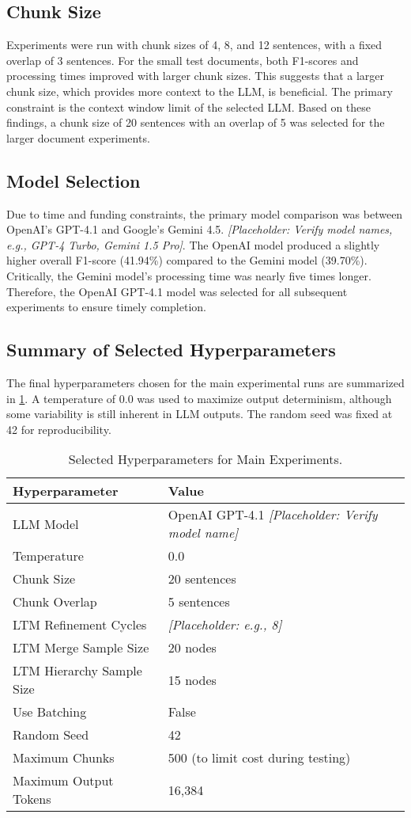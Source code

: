 \subsection{Chunk Size}
Experiments were run with chunk sizes of 4, 8, and 12 sentences, with a fixed overlap of 3 sentences. For the small test documents, both F1-scores and processing times improved with larger chunk sizes. This suggests that a larger chunk size, which provides more context to the LLM, is beneficial. The primary constraint is the context window limit of the selected LLM. Based on these findings, a chunk size of 20 sentences with an overlap of 5 was selected for the larger document experiments.

\subsection{Model Selection}
Due to time and funding constraints, the primary model comparison was between OpenAI's GPT-4.1 and Google's Gemini 4.5. \textit{[Placeholder: Verify model names, e.g., GPT-4 Turbo, Gemini 1.5 Pro]}. The OpenAI model produced a slightly higher overall F1-score (41.94\%) compared to the Gemini model (39.70\%). Critically, the Gemini model's processing time was nearly five times longer. Therefore, the OpenAI GPT-4.1 model was selected for all subsequent experiments to ensure timely completion.

\subsection{Summary of Selected Hyperparameters}
The final hyperparameters chosen for the main experimental runs are summarized in \cref{tab:final_hyperparameters}. A temperature of 0.0 was used to maximize output determinism, although some variability is still inherent in LLM outputs. The random seed was fixed at 42 for reproducibility.

\begin{table}[!htbp]
\centering
\caption{Selected Hyperparameters for Main Experiments.}
\label{tab:final_hyperparameters}
\begin{tabular}{@{}ll@{}}
\toprule
\textbf{Hyperparameter} & \textbf{Value} \\ \midrule
LLM Model & OpenAI GPT-4.1 \textit{[Placeholder: Verify model name]} \\
Temperature & 0.0 \\
Chunk Size & 20 sentences \\
Chunk Overlap & 5 sentences \\
LTM Refinement Cycles & \textit{[Placeholder: e.g., 8]} \\
LTM Merge Sample Size & 20 nodes \\
LTM Hierarchy Sample Size & 15 nodes \\
Use Batching & False \\
Random Seed & 42 \\
Maximum Chunks & 500 (to limit cost during testing) \\
Maximum Output Tokens & 16,384 \\ \bottomrule
\end{tabular}
\end{table}


